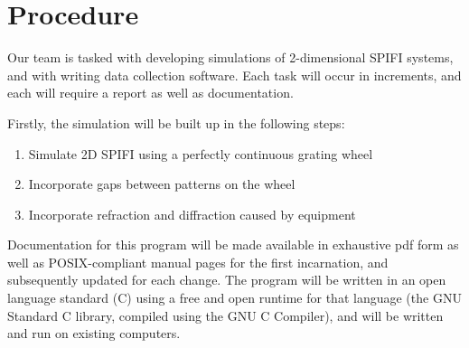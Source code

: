 \documentclass[12pt]{article}
\begin{document}
\section*{Procedure}
Our team is tasked with developing simulations of 2-dimensional SPIFI
systems, and with writing data collection software. Each task will occur
in increments, and each will require a report as well as documentation.

Firstly, the simulation will be built up in the following steps:
\begin{enumerate}
\item Simulate 2D SPIFI using a perfectly continuous grating wheel
\item Incorporate gaps between patterns on the wheel
\item Incorporate refraction and diffraction caused by equipment
\end{enumerate}
Documentation for this program will be made available in exhaustive pdf 
form as well as POSIX-compliant manual pages for the first incarnation, and
subsequently updated for each change. The program will be written in an
open language standard (C) using a free and open runtime for that 
language (the GNU Standard C library, compiled using the GNU C Compiler),
and will be written and run on existing computers.
\end{document}
